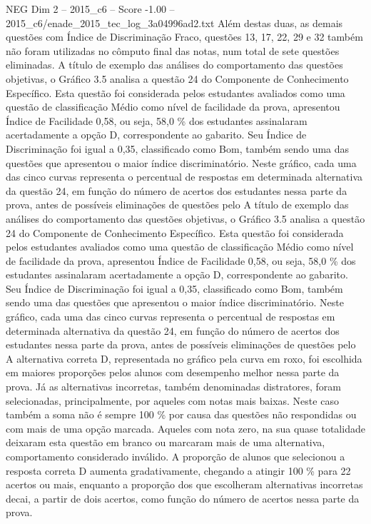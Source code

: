 \begin{textsample}{NEG Dim 2 – 2015\_c6 – Score -1.00 – 2015\_c6/enade\_2015\_tec\_log\_3a04996ad2.txt}
Além destas duas, as demais questões com Índice de Discriminação Fraco, questões 13, 17, 22, 29 e 32 também não foram utilizadas no cômputo final das notas, num total de sete questões eliminadas.
A título de exemplo das análises do comportamento das questões objetivas, o Gráfico 3.5 analisa a questão 24 do Componente de Conhecimento Específico.
Esta questão foi considerada pelos estudantes avaliados como uma questão de classificação Médio como nível de facilidade da prova, apresentou Índice de Facilidade 0,58, ou seja, 58,0 \% dos estudantes assinalaram acertadamente a opção D, correspondente ao gabarito.
Seu Índice de Discriminação foi igual a 0,35, classificado como Bom, também sendo uma das questões que apresentou o maior índice discriminatório.
Neste gráfico, cada uma das cinco curvas representa o percentual de respostas em determinada alternativa da questão 24, em função do número de acertos dos estudantes nessa parte da prova, antes de possíveis eliminações de questões pelo A título de exemplo das análises do comportamento das questões objetivas, o Gráfico 3.5 analisa a questão 24 do Componente de Conhecimento Específico.
Esta questão foi considerada pelos estudantes avaliados como uma questão de classificação Médio como nível de facilidade da prova, apresentou Índice de Facilidade 0,58, ou seja, 58,0 \% dos estudantes assinalaram acertadamente a opção D, correspondente ao gabarito.
Seu Índice de Discriminação foi igual a 0,35, classificado como Bom, também sendo uma das questões que apresentou o maior índice discriminatório.
Neste gráfico, cada uma das cinco curvas representa o percentual de respostas em determinada alternativa da questão 24, em função do número de acertos dos estudantes nessa parte da prova, antes de possíveis eliminações de questões pelo A alternativa correta D, representada no gráfico pela curva em roxo, foi escolhida em maiores proporções pelos alunos com desempenho melhor nessa parte da prova.
Já as alternativas incorretas, também denominadas distratores, foram selecionadas, principalmente, por aqueles com notas mais baixas.
Neste caso também a soma não é sempre 100 \% por causa das questões não respondidas ou com mais de uma opção marcada.
Aqueles com nota zero, na sua quase totalidade deixaram esta questão em branco ou marcaram mais de uma alternativa, comportamento considerado inválido.
A proporção de alunos que selecionou a resposta correta D aumenta gradativamente, chegando a atingir 100 \% para 22 acertos ou mais, enquanto a proporção dos que escolheram alternativas incorretas decai, a partir de dois acertos, como função do número de acertos nessa parte da prova.

\end{textsample}
